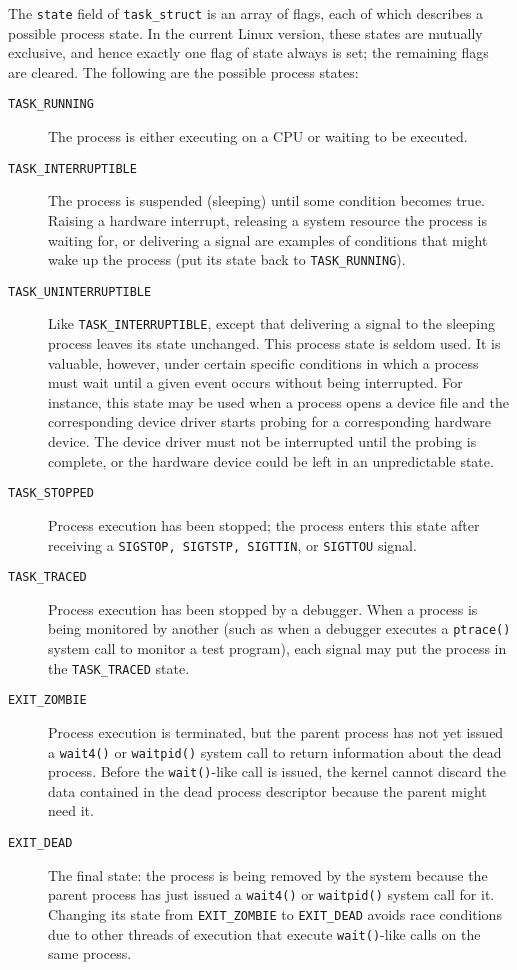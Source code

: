  The
\texttt{state} field of \texttt{task\_struct} is an array of flags, each of which describes a
possible process state. In the current Linux version, these states are mutually exclusive,
and hence exactly one flag of state always is set; the remaining flags are cleared. The
following are the possible process states:
\begin{description}
\item[\texttt{TASK\_RUNNING}] The process is either executing on a CPU or waiting to be
  executed.
\item[\texttt{TASK\_INTERRUPTIBLE}] The process is suspended (sleeping) until some condition
  becomes true. Raising a hardware interrupt, releasing a system resource the process is
  waiting for, or delivering a signal are examples of conditions that might wake up the
  process (put its state back to \texttt{TASK\_RUNNING}).
\item[\texttt{TASK\_UNINTERRUPTIBLE}] Like \texttt{TASK\_INTERRUPTIBLE}, except that
  delivering a signal to the sleeping process leaves its state unchanged. This process
  state is seldom used. It is valuable, however, under certain specific conditions in
  which a process must wait until a given event occurs without being interrupted. For
  instance, this state may be used when a process opens a device file and the
  corresponding device driver starts probing for a corresponding hardware device. The
  device driver must not be interrupted until the probing is complete, or the hardware
  device could be left in an unpredictable state.
\item[\texttt{TASK\_STOPPED}] Process execution has been stopped; the process enters this
  state after receiving a \texttt{SIGSTOP, SIGTSTP, SIGTTIN}, or
  \texttt{SIGTTOU} signal.
\item[\texttt{TASK\_TRACED}] Process execution has been stopped by a debugger. When a
  process is being monitored by another (such as when a debugger executes a
  \texttt{ptrace()} system call to monitor a test program), each signal may put the process
  in the \texttt{TASK\_TRACED} state.
\item[\texttt{EXIT\_ZOMBIE}] Process execution is terminated, but the parent process has not
  yet issued a \texttt{wait4()} or \texttt{waitpid()} system call to return information about
  the dead process. Before the \texttt{wait()}-like call is issued, the kernel cannot
  discard the data contained in the dead process descriptor because the parent might need
  it.
\item[\texttt{EXIT\_DEAD}] The final state: the process is being removed by the system
  because the parent process has just issued a \texttt{wait4()} or \texttt{waitpid()} system
  call for it. Changing its state from \texttt{EXIT\_ZOMBIE} to \texttt{EXIT\_DEAD} avoids
  race conditions due to other threads of execution that execute \texttt{wait()}-like calls
  on the same process.
\end{description}

